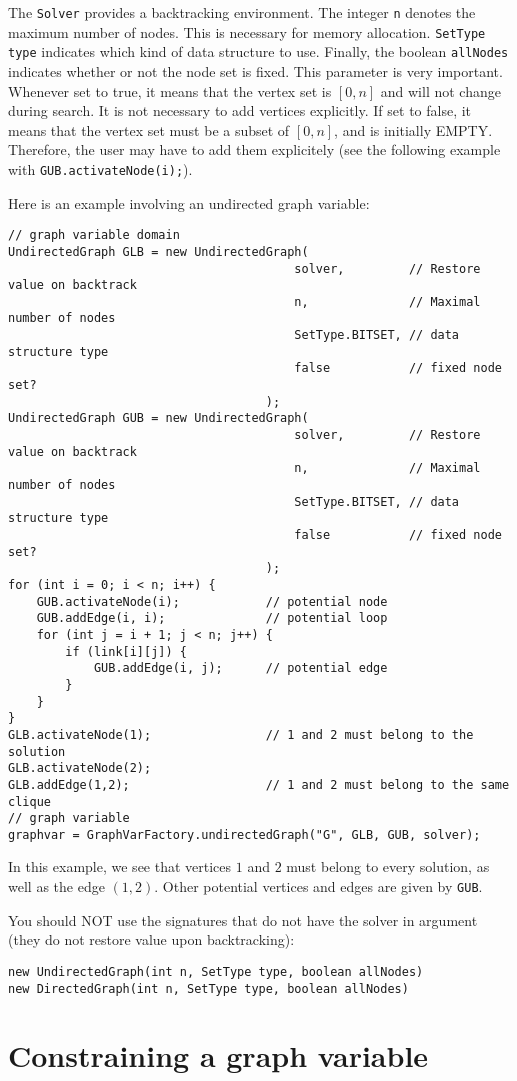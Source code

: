 \documentclass{doc}
\begin{document}
The \texttt{Solver} provides a backtracking environment. The integer \texttt{n} denotes the maximum number of nodes. 
This is necessary for memory allocation. \texttt{SetType type} indicates which kind of data structure to use. 
Finally, the boolean \texttt{allNodes} indicates whether or not the node set is fixed. This parameter is very important. Whenever set to true, it means that the vertex set is $[0,n]$ and will not change during search. It is not necessary to add vertices explicitly. If set to false, it means that the vertex set must be a subset of $[0,n]$, and is initially EMPTY. Therefore, the user may have to add them explicitely (see the following example with \texttt{GUB.activateNode(i);}).

Here is an example involving an undirected graph variable:

\begin{lstlisting}
// graph variable domain
UndirectedGraph GLB = new UndirectedGraph(
										solver,			// Restore value on backtrack
										n,				// Maximal number of nodes
										SetType.BITSET,	// data structure type
										false			// fixed node set?
									);
UndirectedGraph GUB = new UndirectedGraph(
										solver,			// Restore value on backtrack
										n,				// Maximal number of nodes
										SetType.BITSET,	// data structure type
										false			// fixed node set?
									);
for (int i = 0; i < n; i++) {
	GUB.activateNode(i);			// potential node
	GUB.addEdge(i, i);				// potential loop
	for (int j = i + 1; j < n; j++) {
		if (link[i][j]) {
			GUB.addEdge(i, j);		// potential edge
		}
	}
}
GLB.activateNode(1);				// 1 and 2 must belong to the solution
GLB.activateNode(2);
GLB.addEdge(1,2);					// 1 and 2 must belong to the same clique
// graph variable
graphvar = GraphVarFactory.undirectedGraph("G", GLB, GUB, solver);
\end{lstlisting}

In this example, we see that vertices $1$ and $2$ must belong to every solution, as well as the edge $(1,2)$. 
Other potential vertices and edges are given by \texttt{GUB}.

You should NOT use the signatures that do not have the solver in argument (they do not restore value upon backtracking):
\begin{lstlisting}
new UndirectedGraph(int n, SetType type, boolean allNodes)
new DirectedGraph(int n, SetType type, boolean allNodes)
\end{lstlisting}

\section{Constraining a graph variable}
\end{document}
